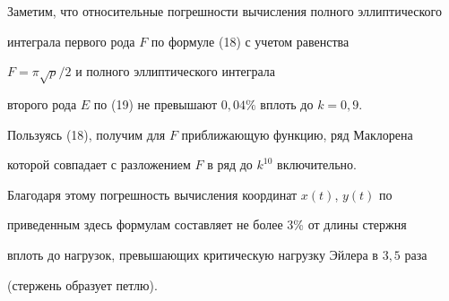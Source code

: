 Заметим, что относительные погрешности вычисления полного эллиптического 


интеграла первого рода $F$ по формуле (18) с учетом равенства 


$F=\pi \sqrt p/2$ и полного эллиптического интеграла 


второго рода $E$ по (19) не превышают $0{,}04\%$ вплоть до $k=0{,}9$.


Пользуясь (18), получим для $F$ приближающую функцию, ряд Маклорена 


которой совпадает с разложением $F$ в ряд до $k^{10}$ включительно. 


Благодаря этому погрешность вычисления координат $x(t)$, $y(t)$ по 


приведенным здесь формулам составляет не более 3\%  от длины стержня  


вплоть до нагрузок, превышающих критическую нагрузку Эйлера в $3{,}5$ раза 


(стержень образует петлю). 





